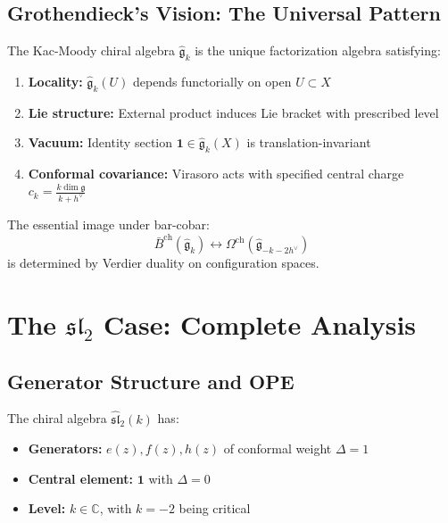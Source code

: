 \subsection{Grothendieck's Vision: The Universal Pattern}

\begin{principle}
The Kac-Moody chiral algebra $\widehat{\mathfrak{g}}_k$ is the unique factorization algebra satisfying:
\begin{enumerate}
\item \textbf{Locality:} $\widehat{\mathfrak{g}}_k(U)$ depends functorially on open $U \subset X$
\item \textbf{Lie structure:} External product induces Lie bracket with prescribed level
\item \textbf{Vacuum:} Identity section $\mathbf{1} \in \widehat{\mathfrak{g}}_k(X)$ is translation-invariant
\item \textbf{Conformal covariance:} Virasoro acts with specified central charge $c_k = \frac{k \dim \mathfrak{g}}{k + h^\vee}$
\end{enumerate}

The essential image under bar-cobar:
$$\bar{B}^{\text{ch}}(\widehat{\mathfrak{g}}_k) \leftrightarrow \Omega^{\text{ch}}(\widehat{\mathfrak{g}}_{-k-2h^\vee})$$
is determined by Verdier duality on configuration spaces.
\end{principle}

\section{The $\mathfrak{sl}_2$ Case: Complete Analysis}

\subsection{Generator Structure and OPE}

\begin{definition}
The chiral algebra $\widehat{\mathfrak{sl}}_2(k)$ has:
\begin{itemize}
\item \textbf{Generators:} $e(z), f(z), h(z)$ of conformal weight $\Delta = 1$
\item \textbf{Central element:} $\mathbf{1}$ with $\Delta = 0$
\item \textbf{Level:} $k \in \mathbb{C}$, with $k = -2$ being critical
\end{itemize}
\end{definition}

